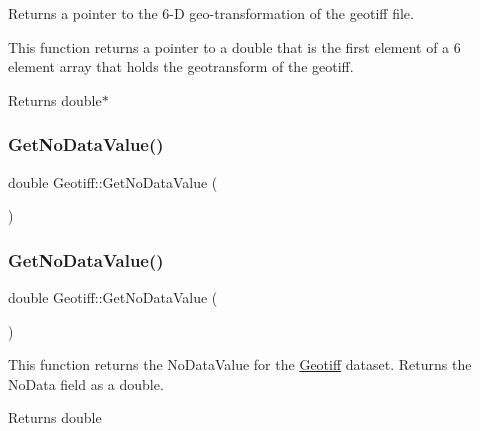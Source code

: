 Returns a pointer to the 6-\/D geo-\/transformation of the geotiff file. 

This function returns a pointer to a double that is the first element of a 6 element array that holds the geotransform of the geotiff.

\begin{DoxyReturn}{Returns}
double$\ast$ 
\end{DoxyReturn}
\mbox{\label{class_geotiff_ac07c56345e9faa2bd95d542ef14dfcb1}} 
\subsubsection{\texorpdfstring{Get\+No\+Data\+Value()}{GetNoDataValue()}\hspace{0.1cm}{\footnotesize\ttfamily [1/2]}}
{\footnotesize\ttfamily double Geotiff\+::\+Get\+No\+Data\+Value (\begin{DoxyParamCaption}{ }\end{DoxyParamCaption})}

\mbox{\label{class_geotiff_ac07c56345e9faa2bd95d542ef14dfcb1}} 
\subsubsection{\texorpdfstring{Get\+No\+Data\+Value()}{GetNoDataValue()}\hspace{0.1cm}{\footnotesize\ttfamily [2/2]}}
{\footnotesize\ttfamily double Geotiff\+::\+Get\+No\+Data\+Value (\begin{DoxyParamCaption}{ }\end{DoxyParamCaption})}



This function returns the No\+Data\+Value for the \hyperlink{class_geotiff}{Geotiff} dataset. Returns the No\+Data field as a double. 

\begin{DoxyReturn}{Returns}
double 
\end{DoxyReturn}
\mbox{\label{class_geotiff_aa5dd4888f23c1957f835264c29b7556a}} 
